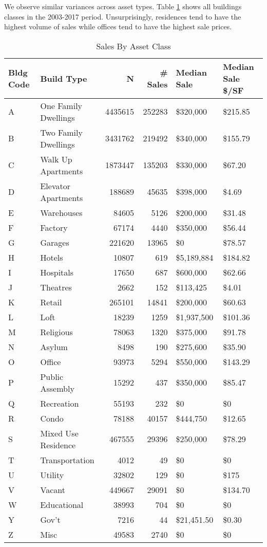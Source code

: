 \documentclass[12pt,]{article}
\begin{document}
We observe similar variances across asset types. Table
\ref{tab:by_class} shows all buildings classes in the 2003-2017 period.
Unsurprisingly, residences tend to have the highest volume of sales
while offices tend to have the highest sale prices.

\begin{table}

\caption{\label{tab:by_class}\label{tab:by_class} Sales By Asset Class}
\centering
\begin{tabular}[t]{llrrll}
\toprule
Bldg Code & Build Type & N & \# Sales & Median Sale & Median Sale \$/SF\\
\midrule
A & One Family Dwellings & 4435615 & 252283 & \$320,000 & \$215.85\\
B & Two Family Dwellings & 3431762 & 219492 & \$340,000 & \$155.79\\
C & Walk Up Apartments & 1873447 & 135203 & \$330,000 & \$67.20\\
D & Elevator Apartments & 188689 & 45635 & \$398,000 & \$4.69\\
E & Warehouses & 84605 & 5126 & \$200,000 & \$31.48\\
\addlinespace
F & Factory & 67174 & 4440 & \$350,000 & \$56.44\\
G & Garages & 221620 & 13965 & \$0 & \$78.57\\
H & Hotels & 10807 & 619 & \$5,189,884 & \$184.82\\
I & Hospitals & 17650 & 687 & \$600,000 & \$62.66\\
J & Theatres & 2662 & 152 & \$113,425 & \$4.01\\
\addlinespace
K & Retail & 265101 & 14841 & \$200,000 & \$60.63\\
L & Loft & 18239 & 1259 & \$1,937,500 & \$101.36\\
M & Religious & 78063 & 1320 & \$375,000 & \$91.78\\
N & Asylum & 8498 & 190 & \$275,600 & \$35.90\\
O & Office & 93973 & 5294 & \$550,000 & \$143.29\\
\addlinespace
P & Public Assembly & 15292 & 437 & \$350,000 & \$85.47\\
Q & Recreation & 55193 & 232 & \$0 & \$0\\
R & Condo & 78188 & 40157 & \$444,750 & \$12.65\\
S & Mixed Use Residence & 467555 & 29396 & \$250,000 & \$78.29\\
T & Transportation & 4012 & 49 & \$0 & \$0\\
\addlinespace
U & Utility & 32802 & 129 & \$0 & \$175\\
V & Vacant & 449667 & 29091 & \$0 & \$134.70\\
W & Educational & 38993 & 704 & \$0 & \$0\\
Y & Gov't & 7216 & 44 & \$21,451.50 & \$0.30\\
Z & Misc & 49583 & 2740 & \$0 & \$0\\
\bottomrule
\end{tabular}
\end{table}
\end{document}
